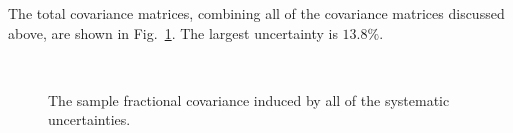 The total covariance matrices, combining all of the covariance matrices discussed above, are shown in Fig.~\ref{fig:TotalCovarianceMatrices}.  The largest uncertainty is $13.8\%$.
\begin{figure}%
  \centering
  \\
  \caption{The sample fractional covariance induced by all of the systematic uncertainties.}
  \label{fig:TotalCovarianceMatrices}
\end{figure}
\newline
\newline
